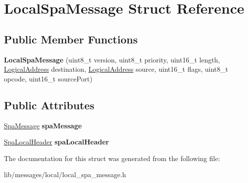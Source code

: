 \hypertarget{structLocalSpaMessage}{}\section{Local\+Spa\+Message Struct Reference}
\label{structLocalSpaMessage}
\subsection*{Public Member Functions}
\begin{DoxyCompactItemize}
\item 
\mbox{\label{structLocalSpaMessage_a3d0882edfa48a1604ec30784308d65d6}} 
{\bfseries Local\+Spa\+Message} (uint8\+\_\+t version, uint8\+\_\+t priority, uint16\+\_\+t length, \hyperlink{structLogicalAddress}{Logical\+Address} destination, \hyperlink{structLogicalAddress}{Logical\+Address} source, uint16\+\_\+t flags, uint8\+\_\+t opcode, uint16\+\_\+t source\+Port)
\end{DoxyCompactItemize}
\subsection*{Public Attributes}
\begin{DoxyCompactItemize}
\item 
\mbox{\label{structLocalSpaMessage_a87829228c5af1850fc3efc288cfbbdfc}} 
\hyperlink{structSpaMessage}{Spa\+Message} {\bfseries spa\+Message}
\item 
\mbox{\label{structLocalSpaMessage_af8cc4ca1b9f7d7d993b563e0110e940a}} 
\hyperlink{structSpaLocalHeader}{Spa\+Local\+Header} {\bfseries spa\+Local\+Header}
\end{DoxyCompactItemize}


The documentation for this struct was generated from the following file\+:\begin{DoxyCompactItemize}
\item 
lib/messages/local/local\+\_\+spa\+\_\+message.\+h\end{DoxyCompactItemize}

